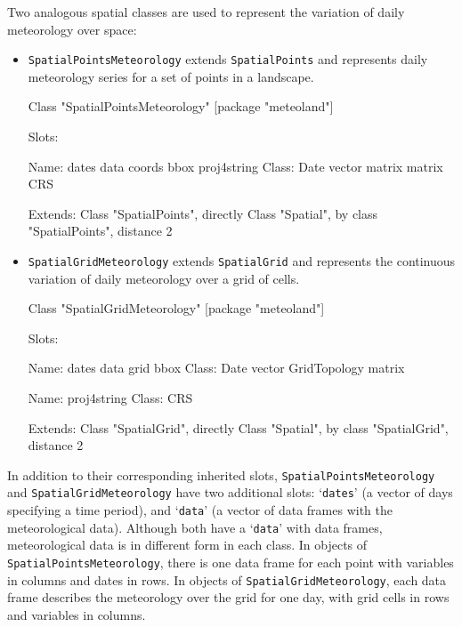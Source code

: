 \documentclass[11pt,a4paper]{article}
\begin{document}
Two analogous spatial classes are used to represent the variation of daily meteorology over space:
\begin{itemize}
\item{\texttt{SpatialPointsMeteorology} extends \texttt{SpatialPoints} and represents daily meteorology series for a set of points in a landscape.
\begin{Schunk}
\begin{Soutput}
Class "SpatialPointsMeteorology" [package "meteoland"]

Slots:
                                                                  
Name:        dates        data      coords        bbox proj4string
Class:        Date      vector      matrix      matrix         CRS

Extends: 
Class "SpatialPoints", directly
Class "Spatial", by class "SpatialPoints", distance 2
\end{Soutput}
\end{Schunk}
}
\item{\texttt{SpatialGridMeteorology} extends \texttt{SpatialGrid} and represents the continuous variation of daily meteorology over a grid of cells.
\begin{Schunk}
\begin{Soutput}
Class "SpatialGridMeteorology" [package "meteoland"]

Slots:
                                                          
Name:         dates         data         grid         bbox
Class:         Date       vector GridTopology       matrix
                   
Name:   proj4string
Class:          CRS

Extends: 
Class "SpatialGrid", directly
Class "Spatial", by class "SpatialGrid", distance 2
\end{Soutput}
\end{Schunk}
}
\end{itemize}
In addition to their corresponding inherited slots, \texttt{SpatialPointsMeteorology} and \texttt{SpatialGridMeteorology} have two additional slots: `\texttt{dates}' (a vector of days specifying a time period), and `\texttt{data}' (a vector of data frames with the meteorological data).
Although both have a `\texttt{data}' with data frames, meteorological data is in different form in each class. In objects of \texttt{SpatialPointsMeteorology}, there is one data frame for each point with variables in columns and dates in rows. In objects of \texttt{SpatialGridMeteorology}, each data frame describes the meteorology over the grid for one day, with grid cells in rows and variables in columns.
\end{document}
